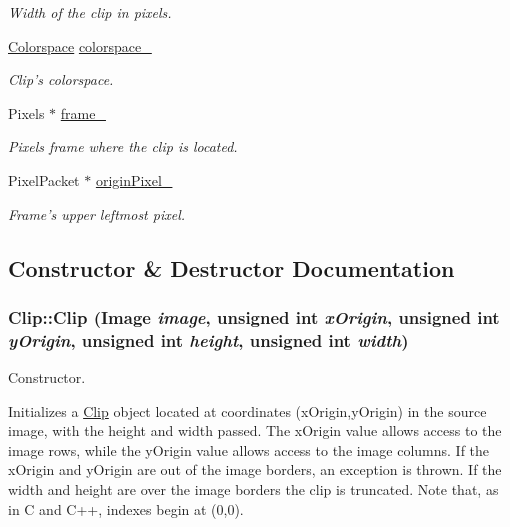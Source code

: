 \begin{CompactItemize}
\begin{CompactList}\small\item\em Width of the clip in pixels. \item\end{CompactList}\item 
\hyperlink{_colorspace_8h_7a7e24cdb2a27271343f0adceff89f65}{Colorspace} \hyperlink{class_clip_51b03c04118374cedeaa0d7a0ba37079}{colorspace\_\-}
\begin{CompactList}\small\item\em Clip's colorspace. \item\end{CompactList}\item 
Pixels $\ast$ \hyperlink{class_clip_2978b7e7061c444375c005ffc3d24416}{frame\_\-}
\begin{CompactList}\small\item\em Pixels frame where the clip is located. \item\end{CompactList}\item 
PixelPacket $\ast$ \hyperlink{class_clip_838228267146fd74e2828b7173b61091}{originPixel\_\-}
\begin{CompactList}\small\item\em Frame's upper leftmost pixel. \item\end{CompactList}\end{CompactItemize}


\subsection{Constructor \& Destructor Documentation}
\hypertarget{class_clip_f8f4312cce2d38d61ce370912e9e7e4a}{
\subsubsection[Clip]{\setlength{\rightskip}{0pt plus 5cm}Clip::Clip (Image {\em image}, \/  unsigned int {\em xOrigin}, \/  unsigned int {\em yOrigin}, \/  unsigned int {\em height}, \/  unsigned int {\em width})}}
\label{class_clip_f8f4312cce2d38d61ce370912e9e7e4a}


Constructor. 

Initializes a \hyperlink{class_clip}{Clip} object located at coordinates (xOrigin,yOrigin) in the source image, with the height and width passed. The xOrigin value allows access to the image rows, while the yOrigin value allows access to the image columns. If the xOrigin and yOrigin are out of the image borders, an exception is thrown. If the width and height are over the image borders the clip is truncated. Note that, as in C and C++, indexes begin at (0,0).

